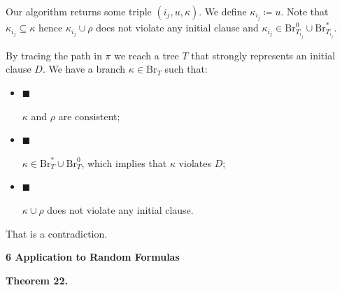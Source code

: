 Our algorithm returns some triple $(i_{j},u,\kappa)$. We define $\kappa_{i_{j}}\coloneqq u$. Note that $\kappa_{i_{j}}\subseteq\kappa$ hence $\kappa_{i_{j}}\cup\rho$ does not violate any initial
clause and $\kappa_{i_{j}}\in\mathrm{Br}^{0}_{T_{i_{j}}}\cup\mathrm{Br}^{*}_{T_{i_{j}}}$.\par




By tracing the path in $\pi$ we reach a tree $T$ that strongly represents an initial clause $D$. We
have a branch $\kappa\in\mathrm{Br}_{T}$ such that:\par


\begin{itemize}


\item[] 
$\blacksquare$ 


$\kappa$ and $\rho$ are consistent;\par





\item[] 
$\blacksquare$ 


$\kappa\in\mathrm{Br}^{*}_{T}\cup\mathrm{Br}^{0}_{T}$, which implies that $\kappa$ violates $D$;\par





\item[] 
$\blacksquare$ 


$\kappa\cup\rho$ does not violate any initial clause.\par





\end{itemize}


That is a contradiction.\par







\par\medskip\noindent\textbf{
6 Application to Random Formulas}\par





\par\medskip\noindent\textbf{
\textbf{Theorem 22}\textbf{.}
}\par



